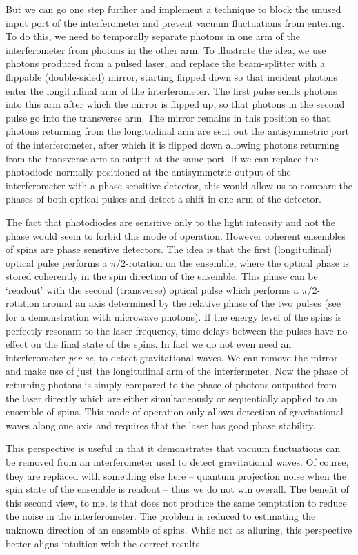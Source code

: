 \documentclass[reqno]{amsart}
\begin{document}
But we can go one step further and implement a technique to block the unused input port of the interferometer and prevent vacuum fluctuations from entering. To do this, we need to temporally separate photons in one arm of the interferometer from photons in the other arm. To illustrate the idea, we use photons produced from a pulsed laser, and replace the beam-splitter with a flippable (double-sided) mirror, starting flipped down so that incident photons enter the longitudinal arm of the interferometer. The first pulse sends photons into this arm after which the mirror is flipped up, so that photons in the second pulse go into the transverse arm. The mirror remains in this position so that photons returning from the longitudinal arm are sent out the antisymmetric port of the interferometer, after which it is flipped down allowing photons returning from the transverse arm to output at the same port. If we can replace the photodiode normally positioned at the antisymmetric output of the interferometer with a phase sensitive detector, this would allow us to compare the phases of both optical pulses and detect a shift in one arm of the detector.

The fact that photodiodes are sensitive only to the light intensity and not the phase would seem to forbid this mode of operation. However coherent ensembles of spins are phase sensitive detectors. The idea is that the first (longitudinal) optical pulse performs a $\pi/2$-rotation on the ensemble, where the optical phase is stored coherently in the spin direction of the ensemble. This phase can be `readout' with the second (transverse) optical pulse which performs a $\pi/2$-rotation around an axis determined by the relative phase of the two pulses (see \cite{McGuinness2021} for a demonstration with microwave photons). If the energy level of the spins is perfectly resonant to the laser frequency, time-delays between the pulses have no effect on the final state of the spins. In fact we do not even need an interferometer \emph{per se}, to detect gravitational waves. We can remove the mirror and make use of just the longitudinal arm of the interfermeter. Now the phase of returning photons is simply compared to the phase of photons outputted from the laser directly which are either simultaneously or sequentially applied to an ensemble of spins. This mode of operation only allows detection of gravitational waves along one axis and requires that the laser has good phase stability.

This perspective is useful in that it demonstrates that vacuum fluctuations can be removed from an interferometer used to detect gravitational waves. Of course, they are replaced with something else here -- quantum projection noise when the spin state of the ensemble is readout -- thus we do not win overall. The benefit of this second view, to me, is that does not produce the same temptation to reduce the noise in the interferometer. The problem is reduced to estimating the unknown direction of an ensemble of spins. While not as alluring, this perspective better aligns intuition with the correct results.
\end{document}
